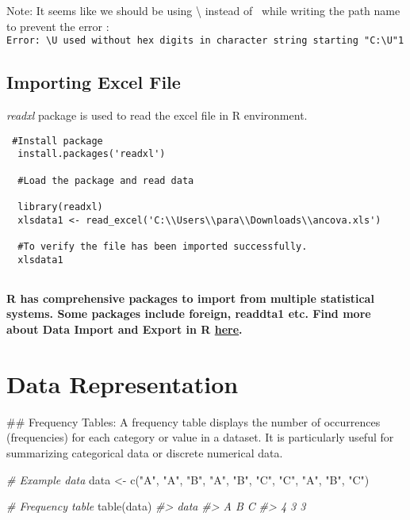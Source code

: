 \documentclass[
]{book}
\newenvironment{Shaded}{\begin{snugshade}}{\end{snugshade}}
\newcommand{\CommentTok}[1]{\textcolor[rgb]{0.56,0.35,0.01}{\textit{#1}}}
\newcommand{\FunctionTok}[1]{\textcolor[rgb]{0.00,0.00,0.00}{#1}}
\newcommand{\NormalTok}[1]{#1}
\newcommand{\OtherTok}[1]{\textcolor[rgb]{0.56,0.35,0.01}{#1}}
\newcommand{\StringTok}[1]{\textcolor[rgb]{0.31,0.60,0.02}{#1}}
\begin{document}
Note: It seems like we should be using \textbackslash{} instead of ~while writing the path name to prevent the error : \texttt{Error:\ \textquotesingle{}\textbackslash{}U\textquotesingle{}\ used\ without\ hex\ digits\ in\ character\ string\ starting\ "\textquotesingle{}C:\textbackslash{}U"1}

\hypertarget{importing-excel-file}{%
\section{Importing Excel File}\label{importing-excel-file}}

\emph{readxl} package is used to read the excel file in R environment.

\begin{verbatim}
 #Install package
  install.packages('readxl')
  
  #Load the package and read data
  
  library(readxl)
  xlsdata1 <- read_excel('C:\\Users\\para\\Downloads\\ancova.xls')
  
  #To verify the file has been imported successfully.
  xlsdata1
  
\end{verbatim}

\textbf{R has comprehensive packages to import from multiple statistical systems. Some packages include foreign, readdta1 etc. Find more about Data Import and Export in R \href{https://cran.r-project.org/doc/manuals/r-release/R-data.html}{here}.}

\hypertarget{data-representation}{%
\chapter{Data Representation}\label{data-representation}}

\#\# Frequency Tables: A frequency table displays the number of occurrences (frequencies) for each category or value in a dataset. It is particularly useful for summarizing categorical data or discrete numerical data.

\begin{Shaded}
\begin{Highlighting}[]
\CommentTok{\# Example data}
\NormalTok{data }\OtherTok{\textless{}{-}} \FunctionTok{c}\NormalTok{(}\StringTok{"A"}\NormalTok{, }\StringTok{"A"}\NormalTok{, }\StringTok{"B"}\NormalTok{, }\StringTok{"A"}\NormalTok{, }\StringTok{"B"}\NormalTok{, }\StringTok{"C"}\NormalTok{, }\StringTok{"C"}\NormalTok{, }\StringTok{"A"}\NormalTok{, }\StringTok{"B"}\NormalTok{, }\StringTok{"C"}\NormalTok{)}

\CommentTok{\# Frequency table}
\FunctionTok{table}\NormalTok{(data)}
\CommentTok{\#\textgreater{} data}
\CommentTok{\#\textgreater{} A B C }
\CommentTok{\#\textgreater{} 4 3 3}
\end{Highlighting}
\end{Shaded}
\end{document}
